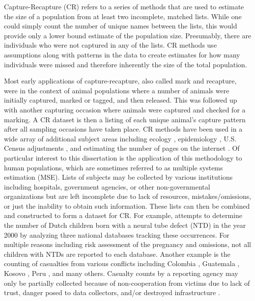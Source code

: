 \documentclass[
  12pt,
]{article}
\begin{document}
Capture-Recapture (CR) refers to a series of methods that are used to
estimate the size of a population from at least two incomplete, matched
lists. While one could simply count the number of unique names between
the lists, this would provide only a lower bound estimate of the
population size. Presumably, there are individuals who were not captured
in any of the lists. CR methods use assumptions along with patterns in
the data to create estimates for how many individuals were missed and
therefore inherently the size of the total population.

Most early applications of capture-recapture, also called mark and
recapture, were in the context of animal populations where a number of
animals were initially captured, marked or tagged, and then released.
This was followed up with another capturing occasion where animals were
captured and checked for a marking. A CR dataset is then a listing of
each unique animal's capture pattern after all sampling occasions have
taken place. CR methods have been used in a wide array of additional
subject areas including ecology \citep{henderson_ecological_2016},
epidemiology \citep{goldberg_estimation_1978,baker_simple_1990}, U.S.
Census adjustments \citep{darroch_three-sample_1993}, and estimating the
number of pages on the internet
\citep{lawrence_searching_1998,khabsa_number_2014}. Of particular
interest to this dissertation is the application of this methodology to
human populations, which are sometimes referred to as multiple systems
estimation (MSE). Lists of subjects may be collected by various
institutions including hospitals, government agencies, or other
non-governmental organizations but are left incomplete due to lack of
resources, mistakes/omissions, or just the inability to obtain such
information. These lists can then be combined and constructed to form a
dataset for CR. For example, \cite{zwane_population_2005} attempts to
determine the number of Dutch children born with a neural tube defect
(NTD) in the year 2000 by analyzing three national databases tracking
these occurrences. For multiple reasons including risk assessment of the
pregnancy and omissions, not all children with NTDs are reported to each
database. Another example is the counting of casualties from various
conflicts including Colombia
\citep{guberek_count_2010,manriquevallier_bayesian_2016}, Guatemala
\citep{ball_making_2000,ball_statistics_2018}, Kosovo
\citep{ball_killings_2002,manriquevallier_bayesian_2016}, Peru
\citep{ball_estimate_2003}, and many others. Casualty counts by a
reporting agency may only be partially collected because of
non-cooperation from victims due to lack of trust, danger posed to data
collectors, and/or destroyed infrastructure
\citep{manrique-vallier_capture-recapture_2020}.
\end{document}
